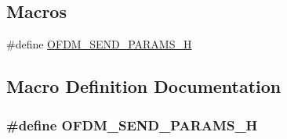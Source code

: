 \subsection*{Macros}
\begin{DoxyCompactItemize}
\item 
\#define \hyperlink{send-params_8h_a71b56f37effff006f7519ffa2e0bade2}{O\+F\+D\+M\+\_\+\+S\+E\+N\+D\+\_\+\+P\+A\+R\+A\+M\+S\+\_\+H}
\end{DoxyCompactItemize}


\subsection{Macro Definition Documentation}
\subsubsection[{\texorpdfstring{O\+F\+D\+M\+\_\+\+S\+E\+N\+D\+\_\+\+P\+A\+R\+A\+M\+S\+\_\+H}{OFDM_SEND_PARAMS_H}}]{\setlength{\rightskip}{0pt plus 5cm}\#define O\+F\+D\+M\+\_\+\+S\+E\+N\+D\+\_\+\+P\+A\+R\+A\+M\+S\+\_\+H}\hypertarget{send-params_8h_a71b56f37effff006f7519ffa2e0bade2}{}\label{send-params_8h_a71b56f37effff006f7519ffa2e0bade2}
